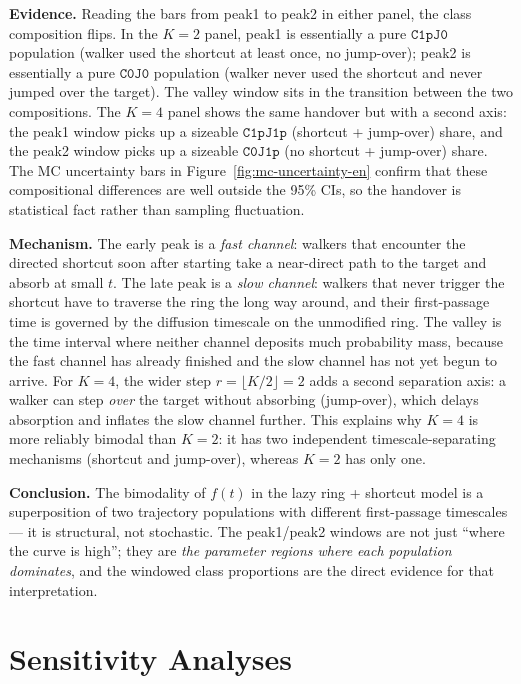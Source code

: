 \documentclass[11pt]{article}
\begin{document}
\textbf{Evidence.} Reading the bars from peak1 to peak2 in either panel,
the class composition flips. In the $K=2$ panel, peak1 is essentially a
pure $\texttt{C1pJ0}$ population (walker used the shortcut at least once,
no jump-over); peak2 is essentially a pure $\texttt{C0J0}$ population
(walker never used the shortcut and never jumped over the target). The
valley window sits in the transition between the two compositions. The
$K=4$ panel shows the same handover but with a second axis: the peak1
window picks up a sizeable $\texttt{C1pJ1p}$ (shortcut + jump-over) share,
and the peak2 window picks up a sizeable $\texttt{C0J1p}$ (no shortcut +
jump-over) share. The MC uncertainty bars in
Figure~\ref{fig:mc-uncertainty-en} confirm that these compositional
differences are well outside the 95\% CIs, so the handover is statistical
fact rather than sampling fluctuation.

\textbf{Mechanism.} The early peak is a \emph{fast channel}: walkers that
encounter the directed shortcut soon after starting take a near-direct
path to the target and absorb at small $t$. The late peak is a \emph{slow
channel}: walkers that never trigger the shortcut have to traverse the
ring the long way around, and their first-passage time is governed by the
diffusion timescale on the unmodified ring. The valley is the time
interval where neither channel deposits much probability mass, because
the fast channel has already finished and the slow channel has not yet
begun to arrive. For $K=4$, the wider step $r=\lfloor K/2\rfloor=2$ adds a
second separation axis: a walker can step \emph{over} the target without
absorbing (jump-over), which delays absorption and inflates the slow
channel further. This explains why $K=4$ is more reliably bimodal than
$K=2$: it has two independent timescale-separating mechanisms (shortcut
and jump-over), whereas $K=2$ has only one.

\textbf{Conclusion.} The bimodality of $f(t)$ in the lazy ring +
shortcut model is a superposition of two trajectory populations with
different first-passage timescales --- it is structural, not stochastic.
The peak1/peak2 windows are not just ``where the curve is high''; they are
\emph{the parameter regions where each population dominates}, and the
windowed class proportions are the direct evidence for that
interpretation.

\section{Sensitivity Analyses}
\end{document}
